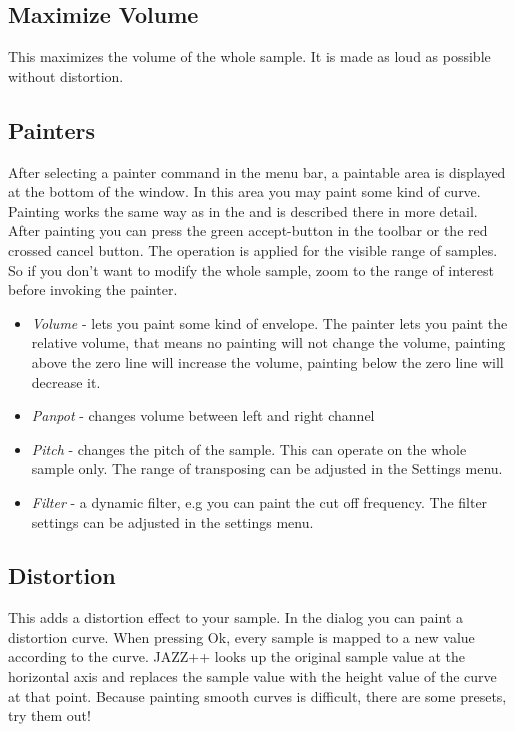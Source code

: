 \documentclass[letterpaper]{report}
\begin{document}
\subsection{Maximize Volume}
This maximizes the volume of the whole sample. It is made as loud as possible
without distortion.


\subsection{Painters}\label{audiopainters}

After selecting a painter command in the menu bar, a paintable area is
displayed at the bottom of the window. In this area you may paint some
kind of curve. Painting works the same way as in the  and is described there in more detail. After
painting you can press the green accept-button in the toolbar or the red
crossed cancel button. The operation is applied for the visible range
of samples. So if you don't want to modify the whole sample, zoom to
the range of interest before invoking the painter.

\begin{itemize}
\item {\em Volume} - lets you paint some kind of envelope. The painter lets you
paint the relative volume, that means no painting will not change the
volume, painting above the zero line will increase the volume, painting
below the zero line will decrease it.
\item {\em Panpot} - changes volume between left and right channel
\item {\em Pitch} - changes the pitch of the sample. This can operate on the
whole sample only. The range of transposing can be adjusted in the
Settings menu.
\item {\em Filter} - a dynamic filter, e.g you can paint the cut off frequency.
The filter settings can be adjusted in the settings menu.
\end{itemize}



\subsection{Distortion}

This adds a distortion effect to your sample. In the dialog you can paint
a distortion curve. When pressing Ok, every sample is mapped to a new
value according to the curve. JAZZ++ looks up the original sample value at the
horizontal axis and replaces the sample value with the height value of
the curve at that point. Because painting smooth curves is difficult, there
are some presets, try them out!
\end{document}
